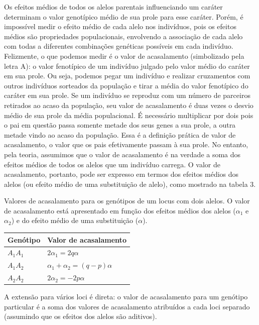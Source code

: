 \documentclass[portuges,]{tufte-handout}
\begin{document}
Os efeitos médios de todos os alelos parentais influenciando um caráter
determinam o valor genotípico médio de sua prole para esse caráter.
Porém, é impossível medir o efeito médio de cada alelo nos indivíduos,
pois os efeitos médios são propriedades populacionais, envolvendo a
associação de cada alelo com todas a diferentes combinações genéticas
possíveis em cada indivíduo. Felizmente, o que podemos medir é o valor
de acasalamento (simbolizado pela letra A): o valor fenotípico de um
indivíduo julgado pelo valor médio do caráter em sua prole. Ou seja,
podemos pegar um indivíduo e realizar cruzamentos com outros indivíduos
sorteados da população e tirar a média do valor fenotípico do caráter em
sua prole. Se um indivíduo se reproduz com um número de parceiros
retirados ao acaso da população, seu valor de acasalamento é duas vezes
o desvio médio de sua prole da média populacional. É necessário
multiplicar por dois pois o pai em questão passa somente metade dos seus
genes a sua prole, a outra metade vindo ao acaso da população. Essa é a
definição prática de valor de acasalamento, o valor que os pais
efetivamente passam à sua prole. No entanto, pela teoria, assumimos que
o valor de acasalamento é na verdade a soma dos efeitos médios de todos
os alelos que um indivíduo carrega. O valor de acasalamento, portanto,
pode ser expresso em termos dos efeitos médios dos alelos (ou efeito
médio de uma substituição de alelo), como mostrado na tabela 3.

\begin{margintable}
  \centering
  \selectfont
  \caption{Valores de acasalamento para os genótipos de um locus com
dois alelos. O valor de acasalamento está apresentado em função dos
efeitos médios dos alelos ($\alpha_1$ e $\alpha_2$) e do efeito médio
de uma substituição ($\alpha$).}
  \begin{tabular}{ll}
    \toprule
Genótipo &   Valor de acasalamento \\
    \midrule
$A_1$$A_1$ & $2\alpha_1 = 2q\alpha$ \\
$A_1$$A_2$ & $\alpha_1 + \alpha_2 = (q-p)\alpha$ \\
$A_2$$A_2$ & $2\alpha_2 = -2p\alpha$ \\
    \bottomrule
  \end{tabular}
\end{margintable}

A extensão para vários loci é direta: o valor de acasalamento para um
genótipo particular é a soma dos valores de acasalamento atribuídos a
cada loci separado (assumindo que os efeitos dos alelos são aditivos).
\end{document}

